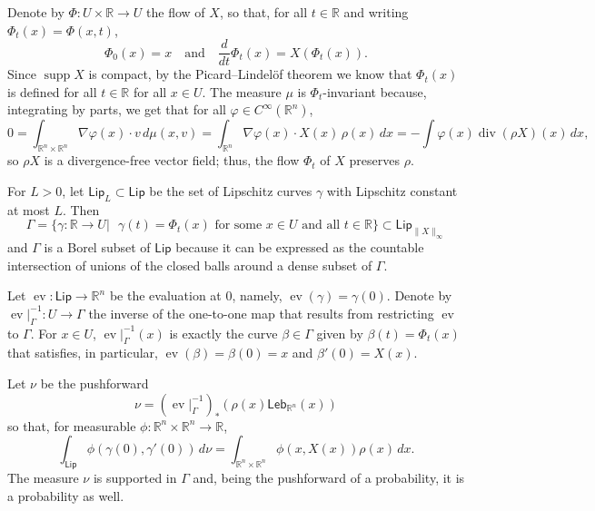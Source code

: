 \documentclass[11pt]{article}
\theoremstyle{definition}
\theoremstyle{remark}
\DeclareMathOperator{\supp}{supp}
\DeclareMathOperator{\divergence}{div}
\newcommand{\R}{\mathbb{R}}
\newcommand{\lebesgue}{\mathsf{Leb}}
\newcommand{\lipschitz}{\mathsf{Lip}}
\begin{document}
Denote by $\Phi\colon U\times\R\to U$ the flow of $X$, so that, for all $t\in\R$ and writing $\Phi_t(x)=\Phi(x,t)$,
\[\Phi_0(x)=x\quad\textrm{and}\quad \frac{d}{dt}\Phi_t(x)=X(\Phi_t(x)).\]
Since $\supp X$ is compact, by the Picard--Lindel\"of theorem we know that $\Phi_t(x)$ is defined for all $t\in\R$ for all $x\in U$.
The measure $\mu$ is $\Phi_t$-invariant because, integrating by parts, we get that for all $\varphi\in C^\infty(\R^n)$,
\begin{equation*}
0=\int_{\R^n\times\R^n} \nabla \varphi(x)\cdot v\,d\mu(x,v)=\int_{\R^n}\nabla\varphi(x)\cdot X(x)\,\rho(x)\,dx=-\int\varphi(x)\divergence(\rho X)(x)\,dx,
\end{equation*}
so $\rho X$ is a divergence-free vector field; thus, the flow $\Phi_t$ of $X$ preserves $\rho$.

%

For $L>0$, let $\lipschitz_L\subset\lipschitz$ be the set of Lipschitz curves $\gamma$ with Lipschitz constant at most $L$. Then 
\[\Gamma=\{\gamma\colon\R\to U|\textrm{ $\gamma(t)=\Phi_t(x)$ for some $x\in U$ and all $t\in\R$}\}\subset\lipschitz_{\|X\|_\infty}\]
and $\Gamma$ is a Borel subset of $\lipschitz$ because it can be expressed as the countable intersection of unions of the closed balls around a dense subset of $\Gamma$. 

Let $\operatorname{ev}\colon\lipschitz\to \R^n$ be the evaluation at 0, namely, $\operatorname{ev}(\gamma)=\gamma(0)$.
Denote by $\operatorname{ev}\!|_\Gamma^{-1}\colon U \to \Gamma$ the inverse of the one-to-one map that results from restricting $\operatorname{ev}$ to $\Gamma$.  For $x\in U$, $\operatorname{ev}|_{\Gamma}^{-1}(x)$ is exactly the curve $\beta\in\Gamma$ given by $\beta(t)=\Phi_t(x)$ that satisfies, in particular, $\operatorname{ev}(\beta)=\beta(0)=x$ and $\beta'(0)=X(x)$.

Let $\nu$ be the pushforward 
\[\nu=(\operatorname{ev}\!|_\Gamma^{-1})_*(\rho(x)\lebesgue_{\R^n}(x)) \]
so that, for measurable $\phi\colon\R^n\times\R^n\to\R$,
\begin{equation*}
\int_{\lipschitz}\phi(\gamma(0),\gamma'(0))\,d\nu =
\int_{\R^n\times\R^n}\phi(x,X(x))\rho(x)\,dx.
\end{equation*}
The measure $\nu$ is supported in $\Gamma$ and, being the pushforward of a probability, it is a probability as well. 
\end{document}
